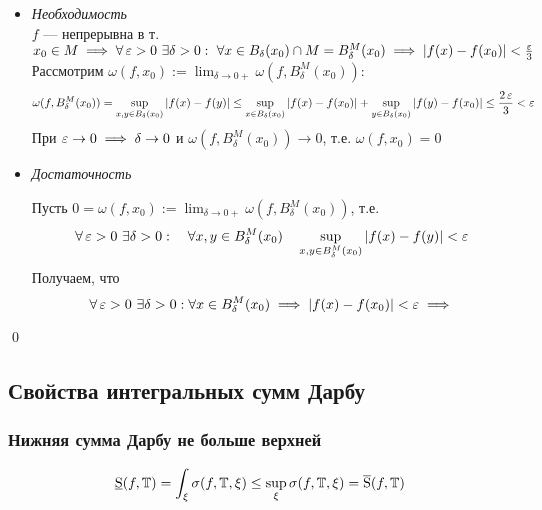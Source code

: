 \documentclass[a4paper]{article}
\begin{document}
\proof
\begin{itemize}
    \item \textit{Необходимость}\\

        $f$ — непрерывна в т. $x_0 \in M \implies \forall \operatorname{\varepsilon} > 0 \,\, \exists\delta > 0:\,\, \forall x \in B_{\delta}(x_0)\cap M = B_{\delta}^M(x_0) \implies |f(x) - f(x_0)| < \frac{\operatorname{\varepsilon}}{3}$\\
        Рассмотрим $\omega(f, x_0) := \displaystyle\lim_{\delta\to0+} \omega(f, B_{\delta}^M(x_0))$:
        \begin{equation*}
            \begin{aligned}
                \omega(f, B_{\delta}^M(x_0)) = \sup_{x, y \in B_{\delta}(x_0)}|f(x) - f(y)| \le \sup_{x\in B_{\delta}(x_0)} |f(x) - f(x_0)| + \sup_{y\in B_{\delta}(x_0)} |f(y) - f(x_0)| \le \frac{2\operatorname{\varepsilon}}{3} < \operatorname{\varepsilon}
            \end{aligned}
        \end{equation*}
        При $\operatorname{\varepsilon}\to0 \implies \delta\to0$ и $\omega(f, B_{\delta}^M(x_0))\to0$, т.е. $\omega(f, x_0) = 0$

    \item \textit{Достаточность}

        Пусть $0 = \omega(f, x_0) := \displaystyle\lim_{\delta\to0+} \omega(f, B_{\delta}^M(x_0))$, т.е.
        \begin{equation*}
            \forall \operatorname{\varepsilon} > 0 \,\, \exists\delta > 0: \quad \forall x, y \in B_{\delta}^M(x_0) \quad \sup_{x, y\in B_{\delta}^M(x_0)} |f(x)-f(y)| < \operatorname{\varepsilon}
        \end{equation*}
        Получаем, что
        \begin{equation*}
            \forall \operatorname{\varepsilon} > 0 \,\, \exists \delta > 0: \forall x \in B_{\delta}^M(x_0) \implies |f(x)-f(x_0)| < \operatorname{\varepsilon} \implies
        \end{equation*}
\end{itemize}\qed

\subsection{Свойства интегральных сумм Дарбу}
\subsubsection{Нижняя сумма Дарбу не больше верхней}
\theorem \begin{equation*}
    \operatorname{\underline{S}}(f, \operatorname{\mathbb{T}}) = \int_{\xi}\sigma(f, \operatorname{\mathbb{T}}, \xi) \le \sup_{\xi}\sigma(f, \operatorname{\mathbb{T}}, \xi) = \operatorname{\overline{S}}(f, \operatorname{\mathbb{T}})
\end{equation*}
\end{document}
